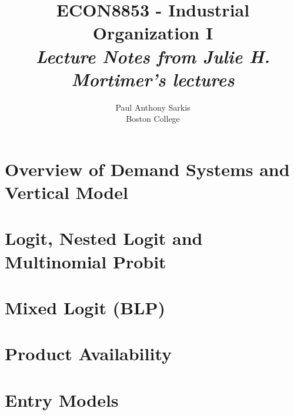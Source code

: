 \documentclass[12pt]{report}
\begin{document}
\date{}
\title{\textbf{\huge{ECON8853 - Industrial Organization I}}\\ \textit{Lecture Notes from Julie H. Mortimer's lectures}}
\author{Paul Anthony Sarkis\\ Boston College} 
 
\maketitle

\tableofcontents


\chapter{Overview of Demand Systems and Vertical Model}


\chapter{Logit, Nested Logit and Multinomial Probit}



\chapter{Mixed Logit (BLP)}


\chapter{Product Availability}



\chapter{Entry Models}
\end{document}
